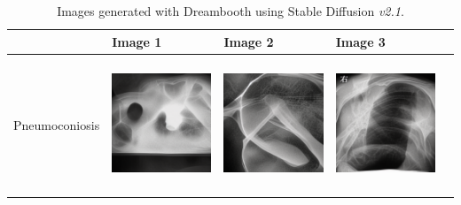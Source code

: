 
\begin{table}[H]
\centering
\begin{tabularx}{\linewidth}{@{}>{\centering\arraybackslash}m{3cm}>{\centering\arraybackslash}X>{\centering\arraybackslash}X>{\centering\arraybackslash}X>{\centering\arraybackslash}X@{}}
\toprule
 & Image 1 & Image 2 & Image 3 \\
\midrule
Pneumoconiosis &
\includegraphics[valign=M,width=\linewidth,height=4cm,keepaspectratio]{main/content/images/sd_dreambooth/dreambooth_v2/xray_1.png} & 
\includegraphics[valign=M,width=\linewidth,height=4cm,keepaspectratio]{main/content/images/sd_dreambooth/dreambooth_v2/xray_2.png} & 
\includegraphics[valign=M,width=\linewidth,height=4cm,keepaspectratio]{main/content/images/sd_dreambooth/dreambooth_v2/xray_3.png} \\
\midrule
\bottomrule
\end{tabularx}
\caption{Images generated with Dreambooth using Stable Diffusion \textit{v2.1}.}
\label{tab:pneumo_image_comparison_dreambooth_v2}
\end{table}

